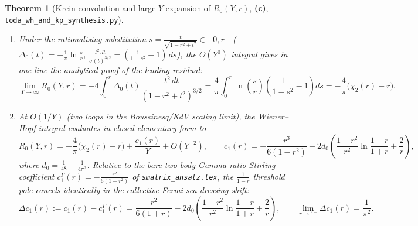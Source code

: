 \documentclass[11pt,a4paper]{article}
\newcommand{\Lc}{\textsf{\textbf{(c)}}}
\newcommand{\scrshort}{\texttt{toda\_\allowbreak wh\_\allowbreak and\_\allowbreak kp\_\allowbreak synthesis.py}}
\newtheorem{theorem}{Theorem}[section]
\theoremstyle{remark}
\begin{document}
\begin{theorem}[Krein convolution and large-$Y$ expansion of $R_0(Y,r)$, \Lc, \scrshort]
\begin{enumerate}
  $c_{\mathrm{edge}}$ terms at $O(Y^0)$ or $O(Y^{-1})$: the $\frac{1-r^2}{4\pi^2 r}\frac{\ln^2 Y}{Y}$
  and $\frac{\ln Y}{Y}$ terms in the bare classical Hessian $Q = \frac{(\delta u_2 - r^2\delta u_1)^2}{r(1-r^2)Y}$
  are cancelled identically by opposite terms in $d\Phi_{\mathrm{loop}}(Y,r) = \Phi_q(u_1,u_2) - \Phi_{\mathrm{cl}}(u_1,u_2)$.
\item Under the rationalising substitution $s = \frac{t}{\sqrt{1-r^2+t^2}} \in [0,r]$
  ($\Delta_0(t) = -\frac{1}{\pi}\ln\frac{s}{r}$, $\frac{t^2\,dt}{\sigma(t)^{3/2}} = (\frac{1}{1-s^2}-1)\,ds$),
  the $O(Y^0)$ integral gives in one line the analytical proof of the leading residual:
  \begin{equation}\label{eq:r0_inf_proof}
    \boxed{\lim_{Y\to\infty} R_0(Y,r) = -4\int_0^r \Delta_0(t)\frac{t^2\,dt}{(1-r^2+t^2)^{3/2}}
    = \frac{4}{\pi}\int_0^r \ln\!\left(\frac{s}{r}\right)\left(\frac{1}{1-s^2} - 1\right)ds
    = -\frac{4}{\pi}\big(\chi_2(r) - r\big).}
  \end{equation}
\item At $O(1/Y)$ (two loops in the Boussinesq/KdV scaling limit), the Wiener--Hopf integral evaluates
  in closed elementary form to
  \begin{equation}\label{eq:c1_exact}
    \boxed{R_0(Y,r) = -\frac{4}{\pi}\big(\chi_2(r)-r\big) + \frac{c_1(r)}{Y} + O(Y^{-2}), \qquad
    c_1(r) = -\frac{r^3}{6(1-r^2)} - 2d_0\left(\frac{1-r^2}{r^2}\ln\frac{1-r}{1+r} + \frac{2}{r}\right),}
  \end{equation}
  where $d_0 = \frac{1}{48} - \frac{1}{4\pi^2}$. Relative to the bare two-body Gamma-ratio Stirling
  coefficient $c_1^\Gamma(r) = -\frac{r^2}{6(1-r^2)}$ of \texttt{smatrix\_ansatz.tex}, the $\frac{1}{1-r}$
  threshold pole cancels identically in the collective Fermi-sea dressing shift:
  \begin{equation}\label{eq:dc1_exact}
    \Delta c_1(r) := c_1(r) - c_1^\Gamma(r)
    = \frac{r^2}{6(1+r)} - 2d_0\left(\frac{1-r^2}{r^2}\ln\frac{1-r}{1+r} + \frac{2}{r}\right), \qquad
    \lim_{r\to 1^-} \Delta c_1(r) = \frac{1}{\pi^2}.
  \end{equation}
\end{enumerate}
\end{theorem}
\end{document}
